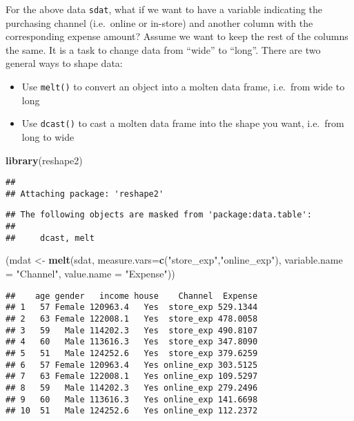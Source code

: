 \documentclass[
]{article}
\newenvironment{Shaded}{\begin{snugshade}}{\end{snugshade}}
\newcommand{\DataTypeTok}[1]{\textcolor[rgb]{0.13,0.29,0.53}{#1}}
\newcommand{\KeywordTok}[1]{\textcolor[rgb]{0.13,0.29,0.53}{\textbf{#1}}}
\newcommand{\NormalTok}[1]{#1}
\newcommand{\StringTok}[1]{\textcolor[rgb]{0.31,0.60,0.02}{#1}}
\providecommand{\tightlist}{%
  \setlength{\itemsep}{0pt}\setlength{\parskip}{0pt}}
\begin{document}
For the above data \texttt{sdat}, what if we want to have a variable
indicating the purchasing channel (i.e.~online or in-store) and another
column with the corresponding expense amount? Assume we want to keep the
rest of the columns the same. It is a task to change data from ``wide''
to ``long''. There are two general ways to shape data:

\begin{itemize}
\tightlist
\item
  Use \texttt{melt()} to convert an object into a molten data frame,
  i.e.~from wide to long
\item
  Use \texttt{dcast()} to cast a molten data frame into the shape you
  want, i.e.~from long to wide
\end{itemize}

\begin{Shaded}
\begin{Highlighting}[]
\KeywordTok{library}\NormalTok{(reshape2)}
\end{Highlighting}
\end{Shaded}

\begin{verbatim}
## 
## Attaching package: 'reshape2'
\end{verbatim}

\begin{verbatim}
## The following objects are masked from 'package:data.table':
## 
##     dcast, melt
\end{verbatim}

\begin{Shaded}
\begin{Highlighting}[]
\NormalTok{(mdat <-}\StringTok{ }\KeywordTok{melt}\NormalTok{(sdat, }\DataTypeTok{measure.vars=}\KeywordTok{c}\NormalTok{(}\StringTok{"store_exp"}\NormalTok{,}\StringTok{"online_exp"}\NormalTok{),}
              \DataTypeTok{variable.name =} \StringTok{"Channel"}\NormalTok{,}
              \DataTypeTok{value.name =} \StringTok{"Expense"}\NormalTok{))}
\end{Highlighting}
\end{Shaded}

\begin{verbatim}
##    age gender   income house    Channel  Expense
## 1   57 Female 120963.4   Yes  store_exp 529.1344
## 2   63 Female 122008.1   Yes  store_exp 478.0058
## 3   59   Male 114202.3   Yes  store_exp 490.8107
## 4   60   Male 113616.3   Yes  store_exp 347.8090
## 5   51   Male 124252.6   Yes  store_exp 379.6259
## 6   57 Female 120963.4   Yes online_exp 303.5125
## 7   63 Female 122008.1   Yes online_exp 109.5297
## 8   59   Male 114202.3   Yes online_exp 279.2496
## 9   60   Male 113616.3   Yes online_exp 141.6698
## 10  51   Male 124252.6   Yes online_exp 112.2372
\end{verbatim}
\end{document}
